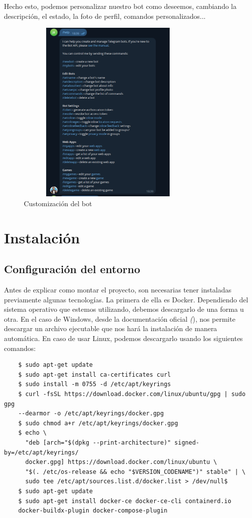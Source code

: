 Hecho esto, podemos personalizar nuestro bot como deseemos, cambiando la descripción, el estado, la foto de perfil, comandos personalizados...

\begin{figure}[!ht]
    \centering
    \includegraphics[width=0.8\textwidth, height=9cm]{imagenes/bot_custom.png}
    \caption{ Customización del bot }
    \label{fig:planificacion}
\end{figure}



\section{Instalación}

\subsection{Configuración del entorno}

Antes de explicar como montar el proyecto, son necesarias tener instaladas previamente algunas tecnologías.
La primera de ella es Docker. Dependiendo del sistema operativo que estemos utilizando, debemos descargarlo de una forma u otra. En el caso de Windows, desde la documentación oficial  \textit({\cite{docker})}, nos permite descargar un archivo ejecutable que nos hará la instalación de manera automática. En caso de usar Linux, podemos descargarlo usando los siguientes comandos:

\begin{verbatim}
    $ sudo apt-get update
    $ sudo apt-get install ca-certificates curl 
    $ sudo install -m 0755 -d /etc/apt/keyrings
    $ curl -fsSL https://download.docker.com/linux/ubuntu/gpg | sudo gpg 
    --dearmor -o /etc/apt/keyrings/docker.gpg
    $ sudo chmod a+r /etc/apt/keyrings/docker.gpg
    $ echo \
      "deb [arch="$(dpkg --print-architecture)" signed-by=/etc/apt/keyrings/
      docker.gpg] https://download.docker.com/linux/ubuntu \
      "$(. /etc/os-release && echo "$VERSION_CODENAME")" stable" | \
      sudo tee /etc/apt/sources.list.d/docker.list > /dev/null$
    $ sudo apt-get update
    $ sudo apt-get install docker-ce docker-ce-cli containerd.io 
    docker-buildx-plugin docker-compose-plugin
\end{verbatim}

